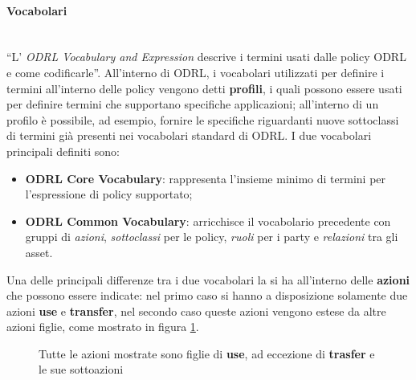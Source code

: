 \documentclass[12pt,a4paper,twoside]{book}
\begin{document}
\paragraph{Vocabolari}\mbox{}\\
\label{profili}
``L' \textit{ODRL Vocabulary and Expression} descrive i termini usati dalle policy ODRL e come codificarle''\cite{ODRVocab}. All'interno di ODRL, i vocabolari utilizzati per definire i termini all'interno delle policy vengono detti \textbf{profili}, i quali possono essere usati per definire termini che supportano specifiche applicazioni; all'interno di un profilo è possibile, ad esempio, fornire le specifiche riguardanti nuove sottoclassi di termini già presenti nei vocabolari standard di ODRL. I due vocabolari principali definiti sono:
\begin{itemize}
	\item \textbf{ODRL Core Vocabulary}: rappresenta l'insieme minimo di termini per l'espressione di policy supportato;
	\item \textbf{ODRL Common Vocabulary}: arricchisce il vocabolario precedente con gruppi di \textit{azioni}, \textit{sottoclassi} per le policy, \textit{ruoli} per i party e \textit{relazioni} tra gli asset.
\end{itemize}
Una delle principali differenze tra i due vocabolari la si ha all'interno delle \textbf{azioni} che possono essere indicate: nel primo caso si hanno a disposizione solamente due azioni \textbf{use} e \textbf{transfer}, nel secondo caso queste azioni vengono estese da altre azioni figlie, come mostrato in figura \ref{imgUseTransfer}.

\begin{figure}[H]
	\centering
	\def\svgwidth{\columnwidth}
	
	\caption{Tutte le azioni mostrate sono figlie di \textbf{use}, ad eccezione di \textbf{trasfer} e le sue sottoazioni\cite{ODRLBestPract}\label{imgUseTransfer}}
\end{figure}
\end{document}

